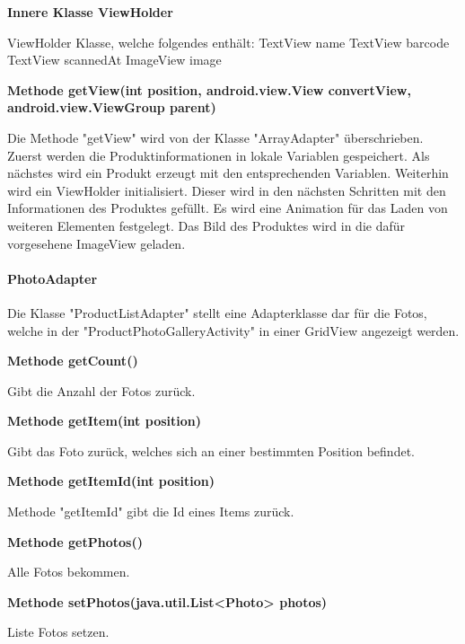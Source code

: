 \documentclass{scrartcl}
\begin{document}
\noindent\textbf{Innere Klasse ViewHolder}

\noindent ViewHolder Klasse, welche folgendes enthält: TextView name TextView barcode TextView scannedAt ImageView image \newline 

\noindent\textbf{Methode getView(int position, \newline                                android.view.View convertView, android.view.ViewGroup parent)}

\noindent Die Methode "getView" wird von der Klasse "ArrayAdapter" überschrieben. Zuerst werden die Produktinformationen in lokale Variablen gespeichert. Als nächstes wird ein Produkt erzeugt mit den entsprechenden Variablen. Weiterhin wird ein ViewHolder initialisiert. Dieser wird in den nächsten Schritten mit den Informationen des Produktes gefüllt. Es wird eine Animation für das Laden von weiteren Elementen festgelegt. Das Bild des Produktes wird in die dafür vorgesehene ImageView geladen. \newline 

\paragraph{PhotoAdapter}
Die Klasse "ProductListAdapter" stellt eine Adapterklasse dar für die Fotos, welche in der "ProductPhotoGalleryActivity" in einer GridView angezeigt werden. \newline 

\noindent\textbf{Methode getCount()}

\noindent Gibt die Anzahl der Fotos zurück. \newline 

\noindent\textbf{Methode getItem(int position)}

\noindent Gibt das Foto zurück, welches sich an einer bestimmten Position befindet. \newline 

\noindent\textbf{Methode getItemId(int position)}

\noindent Methode "getItemId" gibt die Id eines Items zurück. \newline 

\noindent\textbf{Methode getPhotos()}

\noindent Alle Fotos bekommen. \newline 

\noindent\textbf{Methode setPhotos(java.util.List<Photo> photos)}

\noindent Liste Fotos setzen. \newline 
\end{document}
